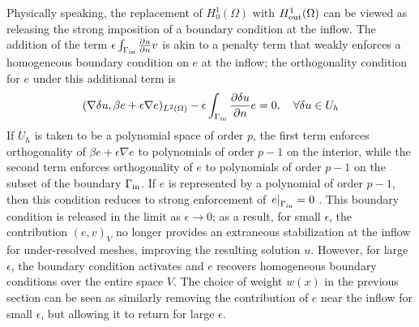 \documentclass[final,leqno]{siamltex}
\newcommand{\nor}[1]{\left\| #1 \right\|}
\newcommand{\LRp}[1]{\left( #1 \right)}
\newcommand{\Grad} {\ensuremath{\nabla}}
\newcommand{\Div} {\ensuremath{\nabla\cdot}}
\renewcommand{\L}{L^2\LRp{\Omega}}
\newcommand{\del}{\Delta}
\newcommand{\pd}[2]{\frac{\partial#1}{\partial#2}}
\begin{document}
Physically speaking, the replacement of $H^1_0(\Omega)$ with $H^1_{\rm out}(\Omega)$ can be viewed as releasing the strong imposition of a boundary condition at the inflow.  
The addition of the term $\epsilon\int_{\Gamma_{\rm in}} \pd{u}{n}v$ is akin to a penalty term that weakly enforces a homogeneous boundary condition on $e$ at the inflow; the orthogonality condition for $e$ under this additional term is
\[
(\Grad \delta u, \beta e + \epsilon \Grad e)_{\L} - \epsilon\int_{\Gamma_{\rm in}} \pd{\delta u}{n}e = 0, \quad \forall \delta u \in U_h
\]
If $U_h$ is taken to be a polynomial space of order $p$, the first term enforces orthogonality of $\beta e + \epsilon \Grad e$ to polynomials of order $p-1$ on the interior, while the second term enforces orthogonality of $e$ to polynomials of order $p-1$ on the subset of the boundary $\Gamma_{\rm in}$.  If $e$ is represented by a polynomial of order $p-1$, then this condition reduces to strong enforcement of $\left. e\right|_{\Gamma_{\rm in}}=0$ \cite{brenner2008mathematical}.  This boundary condition is released in the limit as $\epsilon \rightarrow 0$; as a result, for small $\epsilon$, the contribution $\LRp{e,v}_V$ no longer provides an extraneous stabilization at the inflow for under-resolved meshes, improving the resulting solution $u$.  However, for large $\epsilon$, the boundary condition activates and $e$ recovers homogeneous boundary conditions over the entire space $V$.  The choice of weight $w(x)$ in the previous section can be seen as similarly removing the contribution of $e$ near the inflow for small $\epsilon$, but allowing it to return for large $\epsilon$.  
\end{document}

